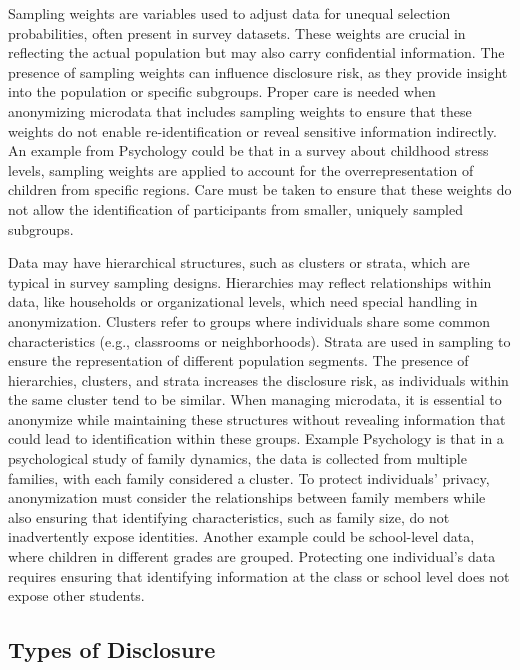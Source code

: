 \documentclass{article}
\begin{document}
Sampling weights are variables used to adjust data for unequal selection probabilities, often present in survey datasets. These weights are crucial in reflecting the actual population but may also carry confidential information. The presence of sampling weights can influence disclosure risk, as they provide insight into the population or specific subgroups. Proper care is needed when anonymizing microdata that includes sampling weights to ensure that these weights do not enable re-identification or reveal sensitive information indirectly.
An example from Psychology could be that in a survey about childhood stress levels, sampling weights are applied to account for the overrepresentation of children from specific regions. Care must be taken to ensure that these weights do not allow the identification of participants from smaller, uniquely sampled subgroups.

Data may have hierarchical structures, such as clusters or strata, which are typical in survey sampling designs. Hierarchies may reflect relationships within data, like households or organizational levels, which need special handling in anonymization. Clusters refer to groups where individuals share some common characteristics (e.g., classrooms or neighborhoods). Strata are used in sampling to ensure the representation of different population segments. The presence of hierarchies, clusters, and strata increases the disclosure risk, as individuals within the same cluster tend to be similar. When managing microdata, it is essential to anonymize while maintaining these structures without revealing information that could lead to identification within these groups.
Example Psychology is that in a psychological study of family dynamics, the data is collected from multiple families, with each family considered a cluster. To protect individuals’ privacy, anonymization must consider the relationships between family members while also ensuring that identifying characteristics, such as family size, do not inadvertently expose identities.
Another example could be school-level data, where children in different grades are grouped. Protecting one individual’s data requires ensuring that identifying information at the class or school level does not expose other students.

\subsection{Types of Disclosure}
\end{document}
